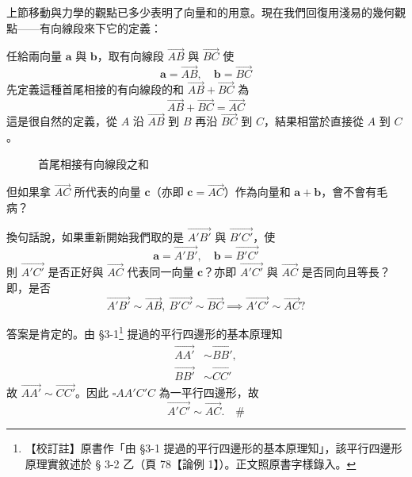 上節移動與力學的觀點已多少表明了向量和的用意。現在我們回復用淺易的幾何觀點——有向線段來下它的定義：

任給兩向量 $\mathbf{a}$ 與 $\mathbf{b}$，取有向線段 $\vec{AB}$ 與 $\vec{BC}$ 使
\[ \mathbf{a} = \vec{AB}, \quad \mathbf{b} = \vec{BC} \]
先定義這種首尾相接的有向線段的和 $\vec{AB} + \vec{BC}$ 為
\[ \vec{AB} + \vec{BC} = \vec{AC} \]
這是很自然的定義，從 $A$ 沿 $\vec{AB}$ 到 $B$ 再沿 $\vec{BC}$ 到 $C$，結果相當於直接從 $A$ 到 $C$。

\begin{figure}[H]
\centering
{}
\caption{首尾相接有向線段之和}
\label{fig:b3-fig3-13}
\end{figure}

但如果拿 $\vec{AC}$ 所代表的向量 $\mathbf{c}$（亦即 $\mathbf{c} = \vec{AC}$）作為向量和 $\mathbf{a} + \mathbf{b}$，會不會有毛病？

換句話說，如果重新開始我們取的是 $\vec{A'B'}$ 與 $\vec{B'C'}$，使
\[ \mathbf{a} = \vec{A'B'}, \quad \mathbf{b} = \vec{B'C'} \]
則 $\vec{A'C'}$ 是否正好與 $\vec{AC}$ 代表同一向量 $\mathbf{c}$？亦即 $\vec{A'C'}$ 與 $\vec{AC}$ 是否同向且等長？即，是否
\[ \vec{A'B'} \sim \vec{AB}, \ \vec{B'C'} \sim \vec{BC} \implies \vec{A'C'} \sim \vec{AC}? \]

\label{note:b3-ch3-p83-sec-ref}%
答案是肯定的。由 §3-1\footnote{【校訂註】原書作「由 §3-1 提過的平行四邊形的基本原理知」，該平行四邊形原理實敘述於 § 3-2 乙（頁 78【論例 1】）。正文照原書字樣錄入。} 提過的平行四邊形的基本原理知
\begin{align*}
\vec{AA'} &\sim \vec{BB'}, \\
\vec{BB'} &\sim \vec{CC'}
\end{align*}
故 $\vec{AA'} \sim \vec{CC'}$。因此 $\square AA'C'C$ 為一平行四邊形，故
\[ \vec{A'C'} \sim \vec{AC}. \quad \# \]

